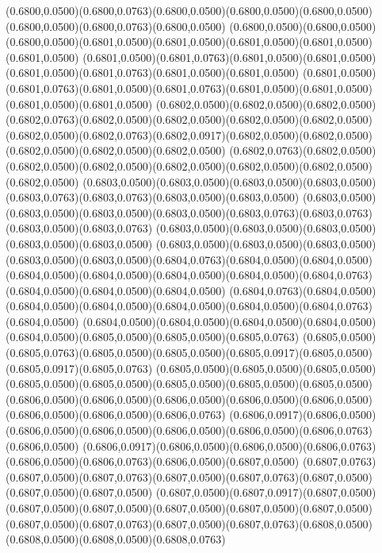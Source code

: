 (0.6800,0.0500)(0.6800,0.0763)(0.6800,0.0500)(0.6800,0.0500)(0.6800,0.0500)(0.6800,0.0500)(0.6800,0.0763)(0.6800,0.0500)
(0.6800,0.0500)(0.6800,0.0500)(0.6800,0.0500)(0.6801,0.0500)(0.6801,0.0500)(0.6801,0.0500)(0.6801,0.0500)(0.6801,0.0500)
(0.6801,0.0500)(0.6801,0.0763)(0.6801,0.0500)(0.6801,0.0500)(0.6801,0.0500)(0.6801,0.0763)(0.6801,0.0500)(0.6801,0.0500)
(0.6801,0.0500)(0.6801,0.0763)(0.6801,0.0500)(0.6801,0.0763)(0.6801,0.0500)(0.6801,0.0500)(0.6801,0.0500)(0.6801,0.0500)
(0.6802,0.0500)(0.6802,0.0500)(0.6802,0.0500)(0.6802,0.0763)(0.6802,0.0500)(0.6802,0.0500)(0.6802,0.0500)(0.6802,0.0500)
(0.6802,0.0500)(0.6802,0.0763)(0.6802,0.0917)(0.6802,0.0500)(0.6802,0.0500)(0.6802,0.0500)(0.6802,0.0500)(0.6802,0.0500)
(0.6802,0.0763)(0.6802,0.0500)(0.6802,0.0500)(0.6802,0.0500)(0.6802,0.0500)(0.6802,0.0500)(0.6802,0.0500)(0.6802,0.0500)
(0.6803,0.0500)(0.6803,0.0500)(0.6803,0.0500)(0.6803,0.0500)(0.6803,0.0763)(0.6803,0.0763)(0.6803,0.0500)(0.6803,0.0500)
(0.6803,0.0500)(0.6803,0.0500)(0.6803,0.0500)(0.6803,0.0500)(0.6803,0.0763)(0.6803,0.0763)(0.6803,0.0500)(0.6803,0.0763)
(0.6803,0.0500)(0.6803,0.0500)(0.6803,0.0500)(0.6803,0.0500)(0.6803,0.0500)
\PST@Solid(0.6803,0.0500)(0.6803,0.0500)(0.6803,0.0500)(0.6803,0.0500)(0.6803,0.0500)(0.6804,0.0763)(0.6804,0.0500)(0.6804,0.0500)
(0.6804,0.0500)(0.6804,0.0500)(0.6804,0.0500)(0.6804,0.0500)(0.6804,0.0763)(0.6804,0.0500)(0.6804,0.0500)(0.6804,0.0500)
(0.6804,0.0763)(0.6804,0.0500)(0.6804,0.0500)(0.6804,0.0500)(0.6804,0.0500)(0.6804,0.0500)(0.6804,0.0763)(0.6804,0.0500)
(0.6804,0.0500)(0.6804,0.0500)(0.6804,0.0500)(0.6804,0.0500)(0.6804,0.0500)(0.6805,0.0500)(0.6805,0.0500)(0.6805,0.0763)
(0.6805,0.0500)(0.6805,0.0763)(0.6805,0.0500)(0.6805,0.0500)(0.6805,0.0917)(0.6805,0.0500)(0.6805,0.0917)(0.6805,0.0763)
(0.6805,0.0500)(0.6805,0.0500)(0.6805,0.0500)(0.6805,0.0500)(0.6805,0.0500)(0.6805,0.0500)(0.6805,0.0500)(0.6805,0.0500)
(0.6806,0.0500)(0.6806,0.0500)(0.6806,0.0500)(0.6806,0.0500)(0.6806,0.0500)(0.6806,0.0500)(0.6806,0.0500)(0.6806,0.0763)
(0.6806,0.0917)(0.6806,0.0500)(0.6806,0.0500)(0.6806,0.0500)(0.6806,0.0500)(0.6806,0.0500)(0.6806,0.0763)(0.6806,0.0500)
(0.6806,0.0917)(0.6806,0.0500)(0.6806,0.0500)(0.6806,0.0763)(0.6806,0.0500)(0.6806,0.0763)(0.6806,0.0500)(0.6807,0.0500)
(0.6807,0.0763)(0.6807,0.0500)(0.6807,0.0763)(0.6807,0.0500)(0.6807,0.0763)(0.6807,0.0500)(0.6807,0.0500)(0.6807,0.0500)
(0.6807,0.0500)(0.6807,0.0917)(0.6807,0.0500)(0.6807,0.0500)(0.6807,0.0500)(0.6807,0.0500)(0.6807,0.0500)(0.6807,0.0500)
(0.6807,0.0500)(0.6807,0.0763)(0.6807,0.0500)(0.6807,0.0763)(0.6808,0.0500)(0.6808,0.0500)(0.6808,0.0500)(0.6808,0.0763)
